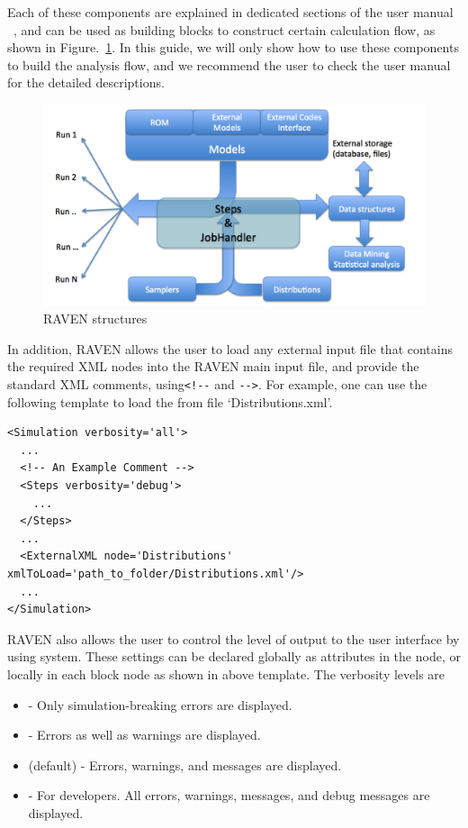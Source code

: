 Each of these components are explained in dedicated sections of the user manual ~\cite{RAVENuserManual}, and can
be used as building blocks to construct certain calculation flow, as shown in Figure.~\ref{fig:ravenStructure}.
In this guide, we will only show how to use these components to build the analysis flow, and we recommend the user
to check the user manual ~\cite{RAVENuserManual} for the detailed descriptions.

\begin{figure}[h!]
  \includegraphics[width=\textwidth]{pics/ravenStructure.png}
  \caption{RAVEN structures}
  \label{fig:ravenStructure}
\end{figure}

In addition, RAVEN allows the user to load any external input file that contains the required XML nodes into the RAVEN main input
file, and provide the standard XML comments, using\verb|<!--| and \verb|-->|. For example, one can use the following template to load
the  from file `Distributions.xml'.
%
\begin{lstlisting}[style=XML,morekeywords={node,xmlToLoad}]
<Simulation verbosity='all'>
  ...
  <!-- An Example Comment -->
  <Steps verbosity='debug'>
    ...
  </Steps>
  ...
  <ExternalXML node='Distributions' xmlToLoad='path_to_folder/Distributions.xml'/>
  ...
</Simulation>
\end{lstlisting}
%
RAVEN also allows the user to control the level of output to the user interface by using  system. These settings can be
declared globally as attributes in the  node, or locally in each block node as shown in above template.
The verbosity levels are
\begin{itemize}
\item {} - Only simulation-breaking errors are displayed.
\item {} - Errors as well as warnings are displayed.
\item {} (default) - Errors, warnings, and messages are displayed.
\item {} - For developers. All errors, warnings, messages, and debug messages are displayed.
\end{itemize}

